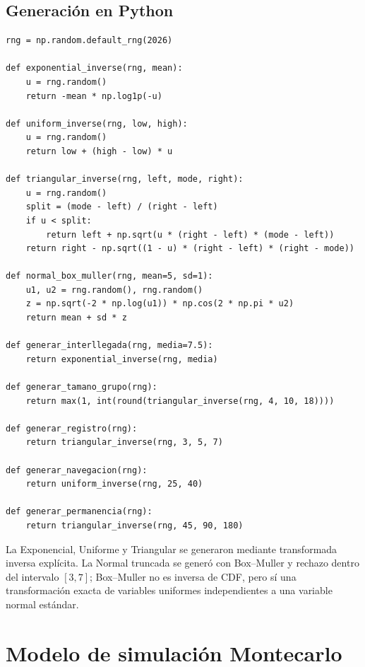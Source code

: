 \documentclass[12pt,a4paper]{article}
\begin{document}
\subsection{Generación en Python}

\begin{lstlisting}[caption={Funciones generadoras de variables aleatorias por transformada}]
rng = np.random.default_rng(2026)

def exponential_inverse(rng, mean):
    u = rng.random()
    return -mean * np.log1p(-u)

def uniform_inverse(rng, low, high):
    u = rng.random()
    return low + (high - low) * u

def triangular_inverse(rng, left, mode, right):
    u = rng.random()
    split = (mode - left) / (right - left)
    if u < split:
        return left + np.sqrt(u * (right - left) * (mode - left))
    return right - np.sqrt((1 - u) * (right - left) * (right - mode))

def normal_box_muller(rng, mean=5, sd=1):
    u1, u2 = rng.random(), rng.random()
    z = np.sqrt(-2 * np.log(u1)) * np.cos(2 * np.pi * u2)
    return mean + sd * z

def generar_interllegada(rng, media=7.5):
    return exponential_inverse(rng, media)

def generar_tamano_grupo(rng):
    return max(1, int(round(triangular_inverse(rng, 4, 10, 18))))

def generar_registro(rng):
    return triangular_inverse(rng, 3, 5, 7)

def generar_navegacion(rng):
    return uniform_inverse(rng, 25, 40)

def generar_permanencia(rng):
    return triangular_inverse(rng, 45, 90, 180)
\end{lstlisting}

\noindent La Exponencial, Uniforme y Triangular se generaron mediante
transformada inversa explícita. La Normal truncada se generó con
Box--Muller y rechazo dentro del intervalo $[3,7]$; Box--Muller no es
inversa de CDF, pero sí una transformación exacta de variables uniformes
independientes a una variable normal estándar.
\section{Modelo de simulación Montecarlo}
\end{document}
